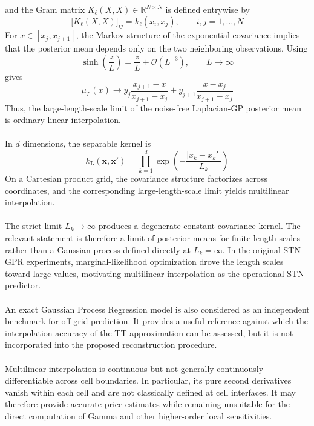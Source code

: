 \documentclass{article}
\numberwithin{equation}{subsection}
\theoremstyle{definition}
\theoremstyle{remark}
\begin{document}
and the Gram matrix
\(K_{\ell}(X,X)\in\mathbb{R}^{N\times N}\) is defined entrywise by
\begin{equation}
\bigl[K_{\ell}(X,X)\bigr]_{ij}
=
k_{\ell}(x_i,x_j),
\qquad
i,j=1,\ldots,N
\end{equation}
For $x\in[x_j,x_{j+1}]$, the Markov structure of the exponential covariance
implies that the posterior mean depends only on the two neighboring
observations. Using
\begin{equation}
\sinh\!\left(\frac{z}{L}\right) = \frac{z}{L} + \mathcal{O}\!\left(L^{-3}\right), \qquad L\rightarrow\infty
\end{equation}
gives
\[
\mu_L(x)
\longrightarrow
y_j
\frac{x_{j+1}-x}
{x_{j+1}-x_j}
+
y_{j+1}
\frac{x-x_j}
{x_{j+1}-x_j}
\]
Thus, the large-length-scale limit of the noise-free Laplacian-GP posterior mean
is ordinary linear interpolation.\\
\\
In $d$ dimensions, the separable kernel is 
\begin{equation}
k_{\boldsymbol{L}}
(\boldsymbol{x},\boldsymbol{x}')
=
\prod_{k=1}^{d}
\exp\!\left(
-\frac{|x_k-x_k'|}{L_k}
\right)
\end{equation}
On a Cartesian product grid, the covariance structure factorizes across
coordinates, and the corresponding large-length-scale limit yields multilinear
interpolation.\\
\\
The strict limit $L_k\rightarrow\infty$ produces a degenerate constant
covariance kernel. The relevant statement is therefore a limit of posterior
means for finite length scales rather than a Gaussian process defined directly
at $L_k=\infty$. In the original STN-GPR experiments, marginal-likelihood
optimization drove the length scales toward large values, motivating
multilinear interpolation as the operational STN predictor.\\
\\
An exact Gaussian Process Regression model is also considered as an independent
benchmark for off-grid prediction. It provides a useful reference against which
the interpolation accuracy of the TT approximation can be assessed, but it is
not incorporated into the proposed reconstruction procedure.\\
\\
Multilinear interpolation is continuous but not generally continuously
differentiable across cell boundaries. In particular, its pure second
derivatives vanish within each cell and are not classically defined at cell
interfaces. It may therefore provide accurate price estimates while remaining
unsuitable for the direct computation of Gamma and other higher-order local
sensitivities.
\end{document}
